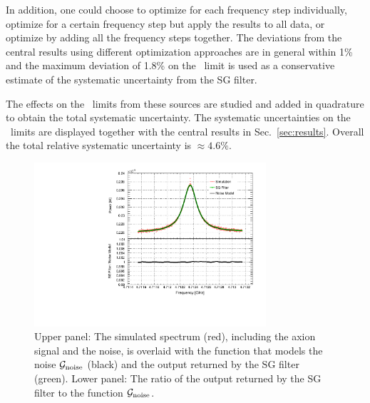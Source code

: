 \begin{itemize}
In addition, one could choose to optimize for each frequency step 
individually, optimize for a certain frequency step but apply the results to 
all data, or optimize by adding all the frequency steps together. 
The deviations from the central results using different optimization 
approaches are in general within 1\% and the 
maximum deviation of 1.8\% 
on the \gagg\ limit is used as a conservative estimate of the systematic 
uncertainty from the SG filter. 

\end{itemize}

The effects on the \gagg\ limits from these sources are studied and added in 
quadrature to obtain the total systematic uncertainty. 
The systematic uncertainties on the \gagg\ limits 
are displayed together with the central results in Sec.~\ref{sec:results}. 
Overall the total relative systematic uncertainty is $\approx 4.6\%$.

\begin{figure} [htbp]
  \centering
  \includegraphics[width=8.6cm]{figures/GeneratedSpectrum_Optimized_SGFilter_NPar_3_Window_141.pdf}
  \caption{Upper panel: 
 The simulated spectrum (red), including the axion signal and the 
noise, is overlaid with the function that models the noise 
${\cal G}_\text{noise}$ (black) and the 
output returned by the SG filter (green). Lower panel: The ratio of the output 
returned by the SG filter to the function ${\cal G}_\text{noise}$.}
  \label{fig:sgcompare}
\end{figure}


